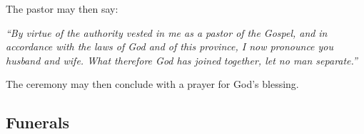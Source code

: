 \begin{outerlst}[left=0pt,labelsep=0pt]
\begin{innerlst}[resume*]
      \item The pastor may then say: 
\end{innerlst}
\textit{{``By virtue of the authority vested in me as a pastor of the Gospel, and}}\textit{ in accordance with the laws of God and of this province, I now pronounce you husband and wife}\textit{. What therefore God has joined}\textit{ together, let no man separate}\textit{.''}  

\begin{innerlst}[resume*]
      \item The ceremony may then conclude with a prayer for God's blessing. 
\end{innerlst} 

\subsection{Funerals}  


\end{outerlst}
